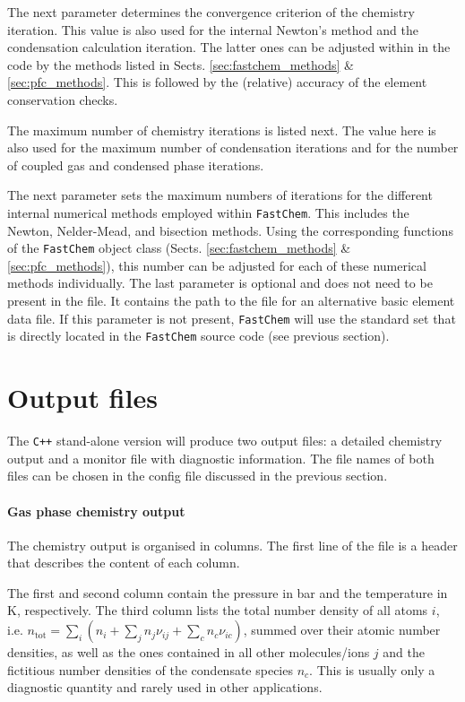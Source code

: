 \documentclass[numbers=noenddot]{aux/fcmanual}
\newcommand{\fc}{\texttt{FastChem}\xspace}
\newcommand{\cpp}{\ttt{C++}\xspace}
\newcommand{\ttt}[1]{\texttt {#1}}
\begin{document}
The next parameter determines the convergence criterion of the chemistry iteration. This value is also used for the internal Newton's method and the condensation calculation iteration. The latter ones can be adjusted within in the code by the methods listed in Sects. \ref{sec:fastchem_methods} \& \ref{sec:pfc_methods}. This is followed by the (relative) accuracy of the element conservation checks. 

The maximum number of chemistry iterations is listed next. The value here is also used for the maximum number of condensation iterations and for the number of coupled gas and condensed phase iterations.

The next parameter sets the maximum numbers of iterations for the different internal numerical methods employed within \fc. This includes the Newton, Nelder-Mead, and bisection methods. Using the corresponding functions of the \fc object class (Sects. \ref{sec:fastchem_methods} \& \ref{sec:pfc_methods}), this number can be adjusted for each of these numerical methods individually. 
The last parameter is optional and does not need to be present in the file. It contains the path to the file for an alternative basic element data file. If this parameter is not present, \fc will use the standard set that is directly located in the \fc source code (see previous section).


\section{Output files}
\label{sec:fc_cpp_output}

The \cpp stand-alone version will produce two output files: a detailed chemistry output and a monitor file with diagnostic information. The file names of both files can be chosen in the config file discussed in the previous section.

\paragraph{Gas phase chemistry output} 
The chemistry output is organised in columns. The first line of the file is a header that describes the content of each column.

The first and second column contain the pressure in bar and the temperature in K, respectively. The third column lists the total number density of all atoms $i$, i.e. $n_\mathrm{tot} = \sum_i \left( n_i + \sum_j n_j \nu_{ij} + \sum_c n_c \nu_{ic} \right)$, summed over their atomic number densities, as well as the ones contained in all other molecules/ions $j$ and the fictitious number densities of the condensate species $n_c$. This is usually only a diagnostic quantity and rarely used in other applications. 
\end{document}

